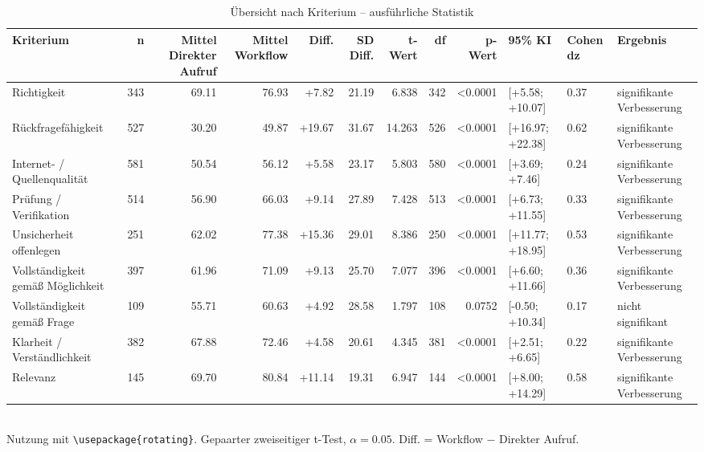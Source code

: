 \begin{table}
\centering
\caption{Übersicht nach Kriterium -- ausführliche Statistik}
\begin{tabular}{lrrrrrrrrlll}
\toprule
Kriterium & n & Mittel Direkter Aufruf & Mittel Workflow & Diff. & SD Diff. & t-Wert & df & p-Wert & 95\% KI & Cohen dz & Ergebnis \\
\midrule
Richtigkeit & 343 & 69.11 & 76.93 & +7.82 & 21.19 & 6.838 & 342 & <0.0001 & [+5.58; +10.07] & 0.37 & signifikante Verbesserung \\
Rückfragefähigkeit & 527 & 30.20 & 49.87 & +19.67 & 31.67 & 14.263 & 526 & <0.0001 & [+16.97; +22.38] & 0.62 & signifikante Verbesserung \\
Internet- / Quellenqualität & 581 & 50.54 & 56.12 & +5.58 & 23.17 & 5.803 & 580 & <0.0001 & [+3.69; +7.46] & 0.24 & signifikante Verbesserung \\
Prüfung / Verifikation & 514 & 56.90 & 66.03 & +9.14 & 27.89 & 7.428 & 513 & <0.0001 & [+6.73; +11.55] & 0.33 & signifikante Verbesserung \\
Unsicherheit offenlegen & 251 & 62.02 & 77.38 & +15.36 & 29.01 & 8.386 & 250 & <0.0001 & [+11.77; +18.95] & 0.53 & signifikante Verbesserung \\
Vollständigkeit gemäß Möglichkeit & 397 & 61.96 & 71.09 & +9.13 & 25.70 & 7.077 & 396 & <0.0001 & [+6.60; +11.66] & 0.36 & signifikante Verbesserung \\
Vollständigkeit gemäß Frage & 109 & 55.71 & 60.63 & +4.92 & 28.58 & 1.797 & 108 & 0.0752 & [-0.50; +10.34] & 0.17 & nicht signifikant \\
Klarheit / Verständlichkeit & 382 & 67.88 & 72.46 & +4.58 & 20.61 & 4.345 & 381 & <0.0001 & [+2.51; +6.65] & 0.22 & signifikante Verbesserung \\
Relevanz & 145 & 69.70 & 80.84 & +11.14 & 19.31 & 6.947 & 144 & <0.0001 & [+8.00; +14.29] & 0.58 & signifikante Verbesserung \\
\bottomrule
\end{tabular}
\\[2mm]
\footnotesize Nutzung mit \texttt{\textbackslash usepackage\{rotating\}}. Gepaarter zweiseitiger t-Test, $\alpha=0.05$. Diff. = Workflow $-$ Direkter Aufruf.
\end{table}
